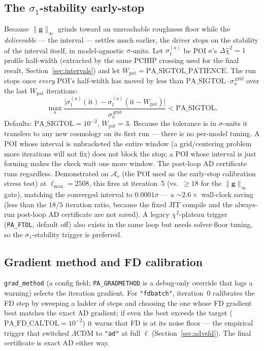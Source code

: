 \documentclass[11pt]{article}
\newcommand{\code}[1]{\texttt{\small #1}}
\newcommand{\chisq}{\chi^2}
\newcommand{\dchisq}{\Delta\hat\chi^2}
\newcommand{\ginf}{\lVert \bm{g}\rVert_\infty}
\newcommand{\Lmax}{\ell_{\max}}
\begin{document}
\subsection{The $\sigma_1$-stability early-stop}
\label{sec:earlystop}

Because $\ginf$ grinds toward an unreachable roughness floor while the
\emph{deliverable} --- the interval --- settles much earlier, the driver
stops on the stability of the interval itself, in model-agnostic
$\sigma$-units. Let $\sigma_1^{(a)}$ be POI $a$'s $\dchisq=1$ profile
half-width (extracted by the same PCHIP crossing used for the final
result, Section~\ref{sec:intervals}) and let
$W_{\mathrm{pat}}=\mathrm{PA\_SIGTOL\_PATIENCE}$. The run stops once
\emph{every} POI's half-width has moved by less than
$\mathrm{PA\_SIGTOL}\cdot\sigma_a^{\,\mathrm{grid}}$ over the last
$W_{\mathrm{pat}}$ iterations:
\begin{equation}
\max_a\frac{\bigl|\sigma_1^{(a)}(\mathrm{it})-\sigma_1^{(a)}
(\mathrm{it}-W_{\mathrm{pat}})\bigr|}{\sigma_a^{\,\mathrm{grid}}}
<\mathrm{PA\_SIGTOL}.
\end{equation}
Defaults: $\mathrm{PA\_SIGTOL}=10^{-2}$, $W_{\mathrm{pat}}=3$. Because
the tolerance is in $\sigma$-units it transfers to any new cosmology on
its first run --- there is no per-model tuning. A POI whose interval is
unbracketed the entire window (a grid/centering problem more iterations
will not fix) does not block the stop; a POI whose interval is just
forming makes the check wait one more window. The post-loop AD
certificate runs regardless. Demonstrated on $\mathcal A_s$ (the POI used
as the early-stop calibration stress test) at $\Lmax=2508$, this fires at
iteration~5 (vs.\ $\ge18$ for the $\ginf$ gate), matching the converged
interval to $0.0001\sigma$ --- a $\sim2.6\times$ wall-clock saving (less
than the $18/5$ iteration ratio, because the fixed JIT compile and the
always-run post-loop AD certificate are not saved). A
legacy $\chisq$-plateau trigger (\code{PA\_FTOL}, default off) also exists
in the same loop but needs solver-floor tuning, so the $\sigma_1$-stability
trigger is preferred.

\subsection{Gradient method and FD calibration}
\label{sec:gradmethod}

\code{grad\_method} (a config field; \code{PA\_GRADMETHOD} is a
debug-only override that logs a warning) selects the iteration gradient.
For \code{"fdbatch"}, iteration~0 calibrates the FD step by sweeping a
ladder of steps and choosing the one whose FD gradient best matches the
exact AD gradient; if even the best exceeds the target
($\mathrm{PA\_FD\_CALTOL}=10^{-2}$) it warns that FD is at its noise floor
--- the empirical trigger that switched $\Lambda$CDM to \code{"ad"} at full
$\ell$ (Section~\ref{sec:advsfd}). The final certificate is exact AD
either way.
\end{document}
